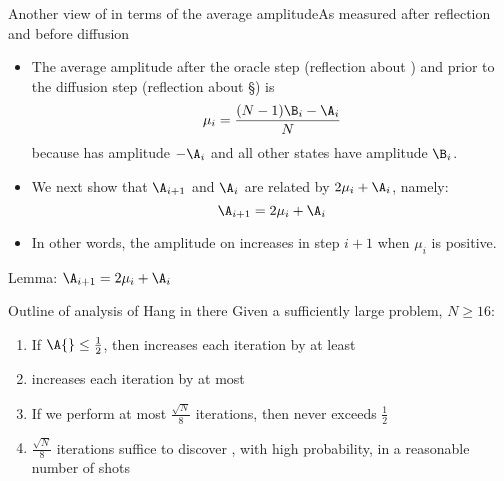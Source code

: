 \begin{Grover}
\begin{frame}{Another view of \A{} in terms of the average amplitude}{As measured after reflection and before diffusion}
\begin{itemize}
    \item The average amplitude \alert{after the oracle step} (reflection about \R{}) and \alert{prior to the diffusion step} (reflection about \S{}) is
    \[ \mu_{i} = \frac{(N-1)\B_{i} -\A_{i}}{N} \]
    because \W{} has amplitude $-\A_{i}$ and all other states have amplitude $\B_{i}$.
    \item We next show that $\A_{i+1}$ and $\A_{i}$ are related by $2\mu_{i} +\A_{i}$, namely:
    \[\A_{i+1} = 2\mu_{i} + \A_{i}
    \]
    \item In other words, the amplitude on \W{} increases in step $i+1$ when $\mu_{i}$ is positive.
\end{itemize}

\end{frame}


\begin{frame}{Lemma: $\A_{i+1} = 2\mu_{i} + \A_{i}$}
\begin{Reasoning}
%
%
%
%
%
%
\end{Reasoning}
\end{frame}

\begin{frame}{Outline of analysis of \A}{Hang in there}
Given a sufficiently large problem, $N\geq 16$:
\begin{enumerate}
   \item If $\A{} \leq \frac{1}{2}$, then \A{} increases each iteration by at least 
    \item \A{} increases each iteration by at most 
        \item If we perform at most $\frac{\sqrt{N}}{8}$ iterations, then \A{} never exceeds $\frac{1}{2}$
        \item $\frac{\sqrt{N}}{8}$ iterations suffice to discover \W{}, with high probability, in a reasonable number of shots


\end{enumerate}
\end{frame}
\end{Grover}
